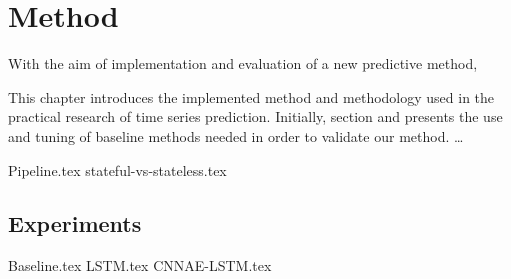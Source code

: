 \chapter{Method}
\label{section:Method}

With the aim of implementation and evaluation of a new predictive method,

This chapter introduces the implemented method and methodology used in the practical research of time series prediction.
Initially, section  and  presents the use and tuning of baseline methods needed in order to validate our method.
\dots

{Pipeline.tex}
{stateful-vs-stateless.tex}

\section{Experiments}
{Baseline.tex}
{LSTM.tex}
{CNNAE-LSTM.tex}
